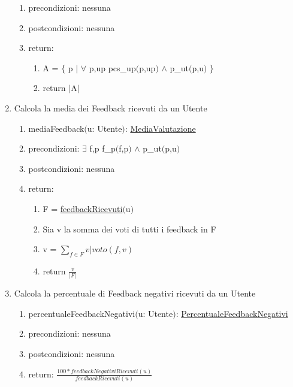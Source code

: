 \documentclass{article}
\begin{document}
\begin{enumerate}
\begin{enumerate}
        \item precondizioni: nessuna
        \item postcondizioni: nessuna
        \item return:
        \begin{enumerate}
            \item A = $\{$ p $|$ $\forall$ p,up pcs\_up$($p,up$)$ $\land$ p\_ut$($p,u$)$ $\}$
            \item return $|$A$|$
        \end{enumerate}
    \end{enumerate}
    \newpage
    \item\label{sec:mediaFeedback} Calcola la media dei Feedback ricevuti da un Utente
    \begin{enumerate}
        \item mediaFeedback$($u: Utente$)$: \hyperref[sec:TipoMediaValutazione]{MediaValutazione}
        \item precondizioni: $\exists$ f,p f\_p$($f,p$)$ $\land$ p\_ut$($p,u$)$
        \item postcondizioni: nessuna
        \item return:
        \begin{enumerate}
            \item F = \hyperref[sec:feedbackRicevuti]{feedbackRicevuti}$($u$)$
            \item Sia v la somma dei voti di tutti i feedback in F
            \item v = $\sum_{f \in F} v | voto(f,v)$
            \item return $\frac{v}{|F|}$
        \end{enumerate}
    \end{enumerate}
    \newpage
    \item\label{sec:percentualeFeedbackNegativi} Calcola la percentuale di Feedback negativi ricevuti da un Utente
    \begin{enumerate}
        \item percentualeFeedbackNegativi$($u: Utente$)$: \hyperref[sec:TipoPercentualeFeedbackNegativi]{PercentualeFeedbackNegativi}
        \item precondizioni: nessuna
        \item postcondizioni: nessuna
        \item return: $\frac{100*\hyperref[sec:feedbackNegativiRicevuti]{feedbackNegativiRicevuti}(u)}{\hyperref[sec:feedbackRicevuti]{feedbackRicevuti}(u)}$
    \end{enumerate}

\end{enumerate}
\end{document}
